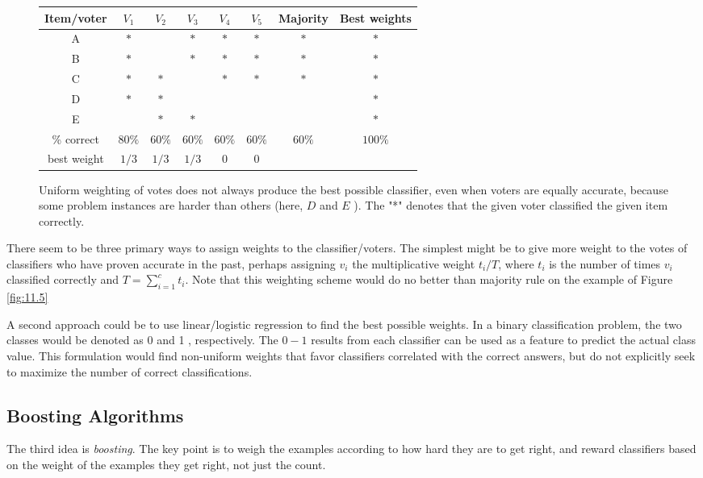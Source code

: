 \documentclass[10pt]{article}
\begin{document}
\begin{enumerate}
\begin{figure}[h!]
\centering
\begin{tabular}{c|ccccc|cc}
Item/voter & $V_{1}$ & $V_{2}$ & $V_{3}$ & $V_{4}$ & $V_{5}$ & Majority & Best weights \\
\hline
A & $*$ &  & $*$ & $*$ & $*$ & $*$ & $*$ \\
B & $*$ &  & $*$ & $*$ & $*$ & $*$ & $*$ \\
C & $*$ & $*$ &  & $*$ & $*$ & $*$ & $*$ \\
D & $*$ & $*$ &  &  &  &  & $*$ \\
E &  & $*$ & $*$ &  &  &  & $*$ \\
\hline
\% correct & $80 \%$ & $60 \%$ & $60 \%$ & $60 \%$ & $60 \%$ & $60 \%$ & $100 \%$ \\
best weight & $1 / 3$ & $1 / 3$ & $1 / 3$ & 0 & 0 &  &  \\
\end{tabular}
\caption{Uniform weighting of votes does not always produce the best possible classifier, even when voters are equally accurate, because some problem instances are harder than others (here, $D$ and $E$ ). The "*" denotes that the given voter classified the given item correctly.}
\end{figure}

There seem to be three primary ways to assign weights to the classifier/voters. The simplest might be to give more weight to the votes of classifiers who have proven accurate in the past, perhaps assigning $v_{i}$ the multiplicative weight $t_{i} / T$, where $t_{i}$ is the number of times $v_{i}$ classified correctly and $T=\sum_{i=1}^{c} t_{i}$. Note that this weighting scheme would do no better than majority rule on the example of Figure \ref{fig:11.5}

A second approach could be to use linear/logistic regression to find the best possible weights. In a binary classification problem, the two classes would be denoted as 0 and 1 , respectively. The $0-1$ results from each classifier can be used as a feature to predict the actual class value. This formulation would find non-uniform weights that favor classifiers correlated with the correct answers, but do not explicitly seek to maximize the number of correct classifications.

\subsection*{Boosting Algorithms}
The third idea is \textit{boosting}. The key point is to weigh the examples according to how hard they are to get right, and reward classifiers based on the weight of the examples they get right, not just the count.


\end{enumerate}
\end{document}
